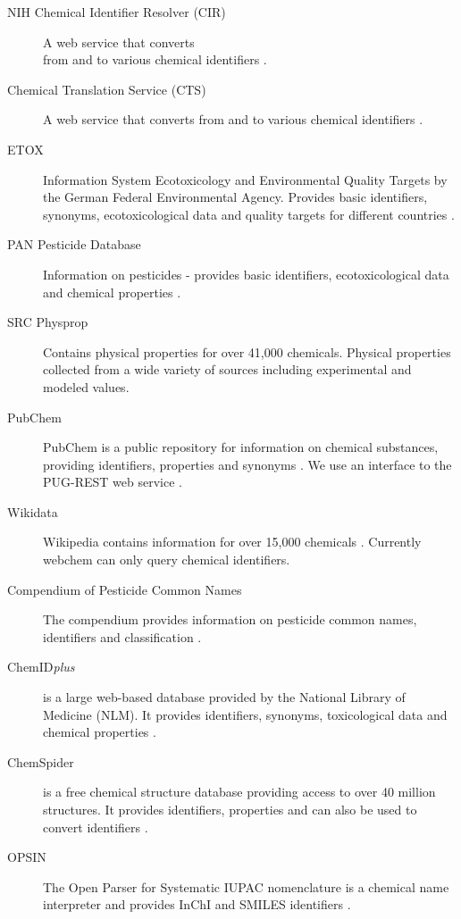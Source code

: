 \begin{description}
  \item[NIH Chemical Identifier Resolver (CIR)]{A web service that converts \\from and to various chemical identifiers \citep{cir}.}
  \item[Chemical Translation Service (CTS)]{A web service that converts from and to various chemical identifiers \citep{wohlgemuth_haldiya_willighagen_kind_fiehn_2010}.}
  \item[ETOX]{Information System Ecotoxicology and Environmental Quality Targets by the German Federal Environmental Agency. Provides basic identifiers, synonyms, ecotoxicological data and quality targets for different countries \citep{etox}.}
  \item[PAN Pesticide Database]{Information on pesticides - provides basic identifiers, ecotoxicological data and chemical properties \citep{pan}.}
  \item[SRC Physprop]{Contains physical properties for over 41,000 chemicals.
  Physical properties collected from a wide variety of sources including experimental and modeled values\citep{physprop}.}
  \item[PubChem]{PubChem is a public repository for information on chemical substances, providing identifiers, properties and synonyms \citep{kim2016}.
  We use an interface to the PUG-REST web service \citep{Kim_Thiessen_Bolton_Bryant_2015}.}
  \item[Wikidata]{Wikipedia contains information for over 15,000 chemicals \citep{Ertl_Patiny_Sander_Rufener_Zasso_2015, wiki}. Currently webchem can only query chemical identifiers.}
  \item[Compendium of Pesticide Common Names]{The compendium provides information on pesticide common names, identifiers and classification \citep{wood}.}
  \item[ChemID\emph{plus}] {is a large web-based database provided by the National Library of Medi\-cine (NLM). It provides identifiers, synonyms, toxicological data and chemical properties \citep{tomasulo2002}.}
  \item[ChemSpider]{is a free chemical structure database providing access to over 40 million structures. It provides identifiers, properties and can also be used to convert identifiers \citep{pence_chemspider:_2010}.}
  \item[OPSIN]{The Open Parser for Systematic IUPAC nomenclature is a chemical name interpreter and provides InChI and SMILES identifiers \citep{lowe_corbett_murray-rust_glen_2011}.}
\end{description}

